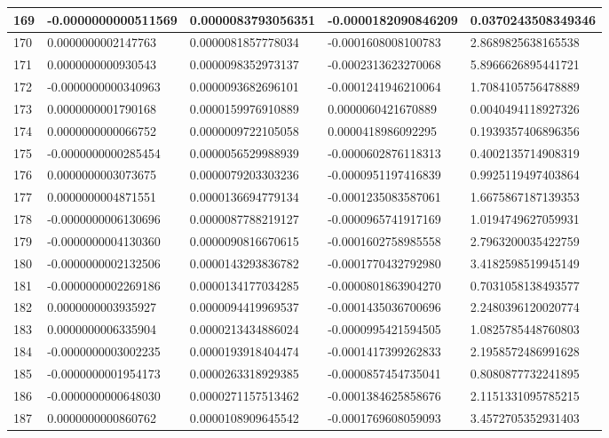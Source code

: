\begin{center}
\begin{longtable}{|p{0.5cm}|p{3.5cm}|p{3.5cm}|p{3.5cm}|p{3.5cm}|}
\hline
169  & -0.0000000000511569  & 0.0000083793056351  & -0.0000182090846209  & 0.0370243508349346\\
\hline
170  & 0.0000000002147763  & 0.0000081857778034  & -0.0001608008100783  & 2.8689825638165538\\
\hline
171  & 0.0000000000930543  & 0.0000098352973137  & -0.0002313623270068  & 5.8966626895441721\\
\hline
172  & -0.0000000000340963  & 0.0000093682696101  & -0.0001241946210064  & 1.7084105756478889\\
\hline
173  & 0.0000000001790168  & 0.0000159976910889  & 0.0000060421670889  & 0.0040494118927326\\
\hline
174  & 0.0000000000066752  & 0.0000009722105058  & 0.0000418986092295  & 0.1939357406896356\\
\hline
175  & -0.0000000000285454  & 0.0000056529988939  & -0.0000602876118313  & 0.4002135714908319\\
\hline
176  & 0.0000000003073675  & 0.0000079203303236  & -0.0000951197416839  & 0.9925119497403864\\
\hline
177  & 0.0000000004871551  & 0.0000136694779134  & -0.0001235083587061  & 1.6675867187139353\\
\hline
178  & -0.0000000006130696  & 0.0000087788219127  & -0.0000965741917169  & 1.0194749627059931\\
\hline
179  & -0.0000000004130360  & 0.0000090816670615  & -0.0001602758985558  & 2.7963200035422759\\
\hline
180  & -0.0000000002132506  & 0.0000143293836782  & -0.0001770432792980  & 3.4182598519945149\\
\hline
181  & -0.0000000002269186  & 0.0000134177034285  & -0.0000801863904270  & 0.7031058138493577\\
\hline
182  & 0.0000000003935927  & 0.0000094419969537  & -0.0001435036700696  & 2.2480396120020774\\
\hline
183  & 0.0000000006335904  & 0.0000213434886024  & -0.0000995421594505  & 1.0825785448760803\\
\hline
184  & -0.0000000003002235  & 0.0000193918404474  & -0.0001417399262833  & 2.1958572486991628\\
\hline
185  & -0.0000000001954173  & 0.0000263318929385  & -0.0000857454735041  & 0.8080877732241895\\
\hline
186  & -0.0000000000648030  & 0.0000271157513462  & -0.0001384625858676  & 2.1151331095785215\\
\hline
187  & 0.0000000000860762  & 0.0000108909645542  & -0.0001769608059093  & 3.4572705352931403\\

\end{longtable}
\end{center}
